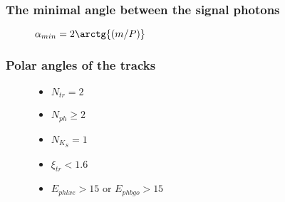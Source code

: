 \documentclass[14pt, hyperref = {colorlinks}]{beamer}
\begin{document}
\begin{frame}\label{r1}
\frametitle{The minimal angle between the signal photons}
\begin{figure}[h]
    \center\textbf{$\alpha_{min} = 2\arctg{(m/P)}$}\\
\begin{minipage}[h]{0.49\linewidth}   
\end{minipage}
\begin{minipage}[h]{0.49\linewidth}
    \begin{itemize}
    \end{itemize}
\end{minipage}
\hfill
\end{figure}
\end{frame}

\begin{frame}\label{r2}
\frametitle{Polar angles of the tracks}
\begin{figure}[h]
\begin{minipage}[h]{0.69\linewidth}   
\end{minipage}
\begin{minipage}[h]{0.29\linewidth}
    \begin{itemize}
        \item {$N_{tr} = 2$}
        \item {$N_{ph} \geq 2$}
        \item {$N_{K_{S}} = 1$}
        \item {$\xi_{tr} < 1.6$}
        \item {$E_{phlxe} > 15$ or $E_{phbgo} > 15$}
    \end{itemize}
\end{minipage}
\hfill
\end{figure}
\end{frame}

\end{document}
